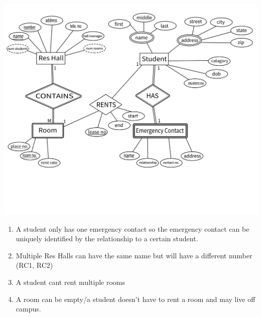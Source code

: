 \documentclass[12pt]{article}
\newcounter{num}
\begin{document}
\section{}
\includegraphics[scale=0.3]{Problem3.png}
\begin{enumerate}
    \item A student only has one emergency contact so the emergency contact can be uniquely identified by the relationship to a certain student.
    \item Multiple Res Halls can have the same name but will have a different number (RC1, RC2)
    \item A student cant rent multiple rooms
    \item A room can be empty/a student doesn't have to rent a room and may live off campus.
\end{enumerate}
\newpage
\end{document}
